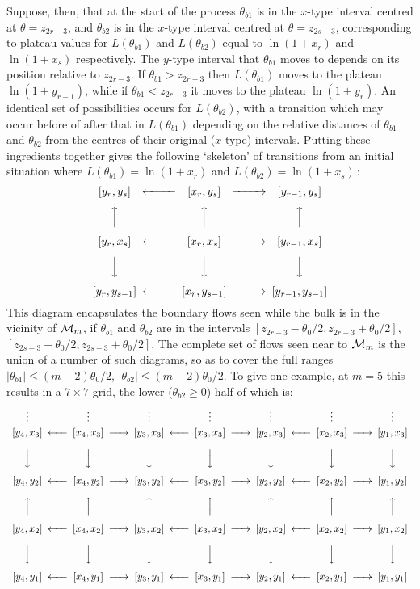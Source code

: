 \documentclass[11pt]{article}
\newcommand{\CM}{{\cal M}}
\newcommand{\tbi}{\theta_{b1}}
\newcommand{\tbii}{\theta_{b2}}
\newcommand{\tz}{\theta_0}
\newcommand\larr{\!\!\!\xleftarrow{~\quad}\!\!\!}
\newcommand\rarr{\!\!\!\xrightarrow{~\quad}\!\!\!}
\begin{document}
Suppose, then, that at the start of the process $\tbi$ is
in the $x$-type interval centred at
$\theta=z_{2r-3}$, and $\tbii$ is in the $x$-type interval centred
at $\theta=z_{2s-3}$, corresponding to plateau values for
$L(\tbi)$ and $L(\tbii)$
equal to $\ln(1+x_r)$ and $\ln(1+x_s)$ respectively.
The $y$-type interval
that $\tbi$ moves to depends on its position relative to $z_{2r-3}$.
If $\tbi>z_{2r-3}$ then 
$L(\tbi)$ moves to the plateau $\ln(1+y_{r-1})$, while if
$\tbi<z_{2r-3}$ it moves to the plateau $\ln(1+y_r)$.
An identical set of possibilities occurs for $L(\tbii)$, with a
transition which may occur before of after that in $L(\tbi)$
depending on the relative distances of $\tbi$ and $\tbii$ from the
centres of their original ($x$-type) intervals. Putting these
ingredients together gives the following `skeleton' of transitions 
from an initial situation where
$L(\tbi)=\ln(1{+}x_r)$ and $L(\tbii)=\ln(1{+}x_s)$\,:
\[
\begin{CD}
[y_{r},y_{s}] @<<< [x_r,y_{s}] @>>> [y_{r-1},y_{s}] \\[2pt]
@AAA @AAA @AAA\\[2pt]
[y_{r},x_{s}] @<<< [x_r,x_{s}] @>>> [y_{r-1},x_{s}] \\[2pt]
@VVV @VVV @VVV\\[2pt]
[y_{r},y_{s-1}] @<<< [x_r,y_{s-1}] @>>> [y_{r-1},y_{s-1}] 
\end{CD}
\]
This diagram encapsulates the boundary flows seen while the bulk is in
the vicinity of $\CM_m$, if $\tbi$ and $\tbii$ are in the intervals
$[z_{2r-3}-\tz/2,z_{2r-3}+\tz/2]$,
$[z_{2s-3}-\tz/2,z_{2s-3}+\tz/2]$. 
The complete set of
flows seen near to $\CM_m$ is the union of a number of such diagrams,
so as to cover the full ranges $|\tbi|\le (m{-}2)\tz/2$,
$|\tbii|\le (m{-}2)\tz/2$. To give one example, at $m=5$ this
results in a $7\times 7$ grid, the lower ($\tbii\ge 0$) half of which
is:
\[
\begin{array}{ccccccccccccc}
\vdots &&\vdots &&\vdots &&\vdots &&\vdots &&\vdots &&\vdots \\[2pt]
[y_4,x_3] &\larr& [x_4,x_3] &\rarr& 
[y_3,x_3] &\larr& [x_3,x_3] &\rarr& 
[y_2,x_3] &\larr& [x_2,x_3] &\rarr& 
[y_1,x_3] \\[10pt]
\Big\downarrow&& \Big\downarrow&& \Big\downarrow&& \Big\downarrow&&
\Big\downarrow&& \Big\downarrow&& \Big\downarrow\\[10pt]
[y_4,y_2] &\larr& [x_4,y_2] &\rarr& 
[y_3,y_2] &\larr& [x_3,y_2] &\rarr& 
[y_2,y_2] &\larr& [x_2,y_2] &\rarr& 
[y_1,y_2] \\[10pt]
\Big\uparrow&& \Big\uparrow&& \Big\uparrow&& \Big\uparrow&&
\Big\uparrow&& \Big\uparrow&& \Big\uparrow\\[10pt]
[y_4,x_2] &\larr& [x_4,x_2] &\rarr& 
[y_3,x_2] &\larr& [x_3,x_2] &\rarr& 
[y_2,x_2] &\larr& [x_2,x_2] &\rarr& 
[y_1,x_2] \\[10pt]
\Big\downarrow&& \Big\downarrow&& \Big\downarrow&& \Big\downarrow&&
\Big\downarrow&& \Big\downarrow&& \Big\downarrow\\[10pt]
[y_4,y_1] &\larr& [x_4,y_1] &\rarr& 
[y_3,y_1] &\larr& [x_3,y_1] &\rarr& 
[y_2,y_1] &\larr& [x_2,y_1] &\rarr& 
[y_1,y_1] 
\end{array}
\]
\end{document}

